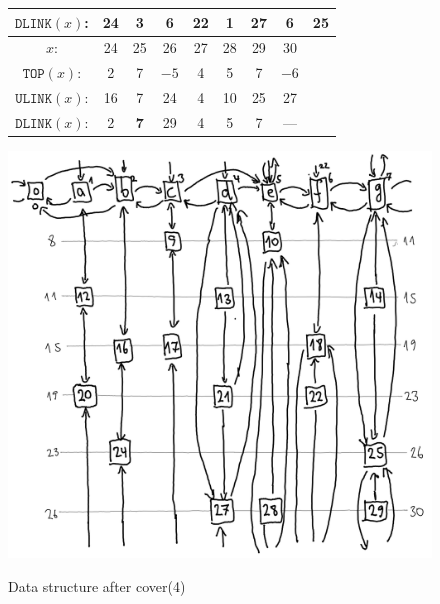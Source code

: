 \documentclass[a4paper,landscape,11pt]{article}
\begin{document}
\begin{figure}[H]
\begin{minipage}[t]{0.48\linewidth}
\begin{tabular}{c c c c c c c c c}
			$\texttt{DLINK}(x)$: & 24  & 3          & 6          & 22         & 1  & 27          & 6    & 25          \\
			\hline
			$x$:                 & 24  & 25         & 26         & 27         & 28 & 29          & 30   &             \\
			$\texttt{TOP}(x)$:   & 2   & 7          & $-5$       & 4          & 5  & 7           & $-6$ &             \\
			$\texttt{ULINK}(x)$: & 16  & 7          & 24         & 4          & 10 & 25          & 27   &             \\
			$\texttt{DLINK}(x)$: & 2   & \textbf{7} & 29         & 4          & 5  & 7           & ---  &             \\
		\end{tabular}
		\label{tab:mem_layout_after_cover_4}
	\end{minipage}
	\hfill
	\begin{minipage}[t]{0.48\linewidth}
		\centering
		\caption{Data structure after cover(4)}
		\includegraphics[width=\linewidth]{vol4b_ex11_p125_3.png}
		\label{fig:data_structure_after_cover_4}
	\end{minipage}
\end{figure}
\end{document}
